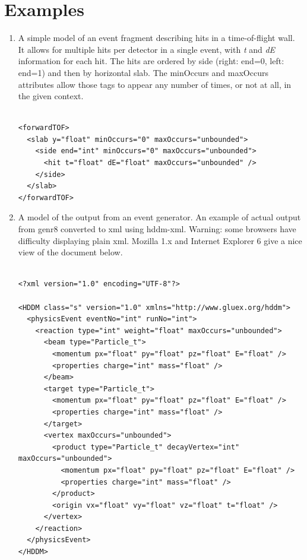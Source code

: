 \documentclass[10pt]{article}
\begin{document}
\section{Examples}
\begin{enumerate}
\item  A simple model of an event fragment describing hits in a time-of-flight wall. It allows for multiple hits per detector in a single event, with \emph{t}
 and \emph{dE}
 information for each hit. The hits are ordered by side (right: end=0, left: end=1) and then by horizontal slab. The minOccurs and maxOccurs attributes allow those tags to appear any number of times, or not at all, in the given context. \begin{verbatim}

<forwardTOF>
  <slab y="float" minOccurs="0" maxOccurs="unbounded">
    <side end="int" minOccurs="0" maxOccurs="unbounded">
      <hit t="float" dE="float" maxOccurs="unbounded" />
    </side>
  </slab>
</forwardTOF>

\end{verbatim}

\item  A model of the output from an event generator. An example of actual output from genr8 converted to xml using hddm-xml. Warning: some browsers have difficulty displaying plain xml. Mozilla 1.x and Internet Explorer 6 give a nice view of the document below. \begin{verbatim}

<?xml version="1.0" encoding="UTF-8"?>

<HDDM class="s" version="1.0" xmlns="http://www.gluex.org/hddm">
  <physicsEvent eventNo="int" runNo="int">
    <reaction type="int" weight="float" maxOccurs="unbounded">
      <beam type="Particle_t">
        <momentum px="float" py="float" pz="float" E="float" />
        <properties charge="int" mass="float" />
      </beam>
      <target type="Particle_t">
        <momentum px="float" py="float" pz="float" E="float" />
        <properties charge="int" mass="float" />
      </target>
      <vertex maxOccurs="unbounded">
        <product type="Particle_t" decayVertex="int" maxOccurs="unbounded">
          <momentum px="float" py="float" pz="float" E="float" />
          <properties charge="int" mass="float" />
        </product>
        <origin vx="float" vy="float" vz="float" t="float" />
      </vertex>
    </reaction>
  </physicsEvent>
</HDDM>

\end{verbatim}


\end{enumerate}
\end{document}
